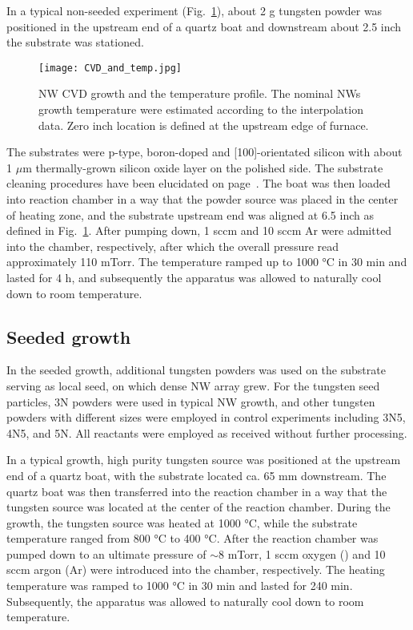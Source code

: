 In a typical non-seeded experiment (Fig.~\ref{fig:wogrow}), about 2 g tungsten powder was positioned in the upstream end of a quartz boat and downstream about 2.5 inch the substrate was stationed. 
\begin{figure}[htb]
\centering
\texttt{[image: CVD\_and\_temp.jpg]}
\caption[ NW CVD growth]{ NW CVD growth and the temperature profile. The nominal NWs growth temperature were estimated according to the interpolation data. Zero inch location is defined at the upstream edge of furnace.}
\label{fig:wogrow}
\end{figure}
The substrates were p-type, boron-doped and [100]-orientated silicon with about 1 $\mu$m thermally-grown silicon oxide layer on the polished side. The substrate cleaning procedures have been elucidated on page~\pageref{ch2sub}. The boat was then loaded into reaction chamber in a way that the powder source was placed in the center of heating zone, and the substrate upstream end was aligned at 6.5 inch as defined in Fig.~\ref{fig:wogrow}. After pumping down, 1 \gls{sccm}  and 10 sccm Ar were admitted into the chamber, respectively, after which the overall pressure read approximately 110 mTorr. The temperature ramped up to 1000 \si{\degreeCelsius} in 30 min and lasted for 4 h, and subsequently the apparatus was allowed to naturally cool down to room temperature.

\subsection{Seeded growth}
In the seeded growth, additional tungsten powders was used on the substrate serving as local seed, on which dense  NW array grew. For the tungsten seed particles, 3N powders were used in typical NW growth, and other tungsten powders with different sizes were employed in control experiments including 3N5, 4N5, and 5N. All reactants were employed as received without further processing.
 
In a typical growth, high purity tungsten source was positioned at the upstream end of a quartz boat, with the substrate located ca. 65 mm downstream. The quartz boat was then transferred into the reaction chamber in a way that the tungsten source was located at the center of the reaction chamber. During the growth, the tungsten source was heated at 1000 \si{\degreeCelsius}, while the substrate temperature ranged from 800 \si{\degreeCelsius} to 400 \si{\degreeCelsius}. After the reaction chamber was pumped down to an ultimate pressure of $\sim8$ mTorr, 1 sccm oxygen () and 10 sccm argon (Ar) were introduced into the chamber, respectively. The heating temperature was ramped to 1000 \si{\degreeCelsius} in 30 min and lasted for 240 min. Subsequently, the apparatus was allowed to naturally cool down to room temperature. 


